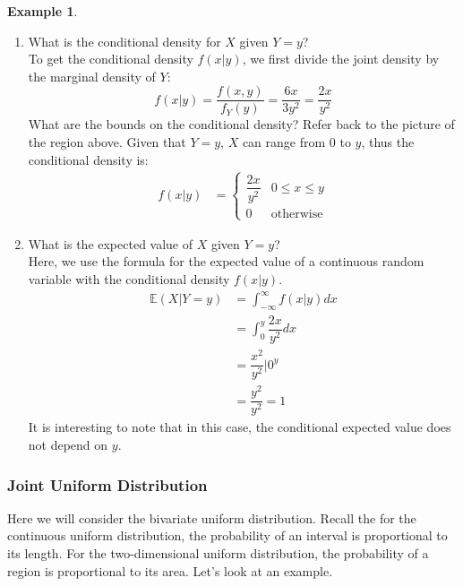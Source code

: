 \documentclass[12pt]{article}
\theoremstyle{definition}
\newtheorem*{example}{Example}
\theoremstyle{remark}
\def\E{{\mathbb E}}
\begin{document}
\begin{example}
\begin{enumerate}
\item What is the conditional density for $X$ given $Y = y$?\\

To get the conditional density $f(x|y)$, we first divide the joint density by the marginal density of $Y$:
\[
f(x|y) = \frac{ f(x, y) }{f_Y(y)} = \frac{ 6 x }{ 3 y^2 } = \frac{ 2 x }{ y^2 }
\]
What are the bounds on the conditional density? Refer back to the picture of the region above. Given that $Y = y$, $X$ can range from 0 to $y$, thus the conditional density is:
\begin{align*}
f(x|y) &=  \begin{cases} 
      \dfrac{ 2 x }{ y^2 } & 0 \leq x \leq y \\
      0 & \textrm{otherwise}
   \end{cases}
\end{align*}

\item What is the expected value of $X$ given $Y = y$?\\

Here, we use the formula for the expected value of a continuous random variable with the conditional density $f(x|y)$.
\begin{align*}
\E(X|Y = y) &= \int_{-\infty}^\infty f(x|y) dx \\
&= \int_0^y \dfrac{ 2 x }{ y^2 } dx \\
&= \dfrac{x^2}{y^2}\Bigr|0^y \\
&= \dfrac{y^2}{y^2} = 1
\end{align*}
It is interesting to note that in this case, the conditional expected value does not depend on $y$.

\end{enumerate}
\end{example}

\subsubsection{Joint Uniform Distribution}
Here we will consider the bivariate uniform distribution. Recall the for the continuous uniform distribution, the probability of an interval is proportional to its length. For the two-dimensional uniform distribution, the probability of a region is proportional to its area. Let's look at an example.
\end{document}
